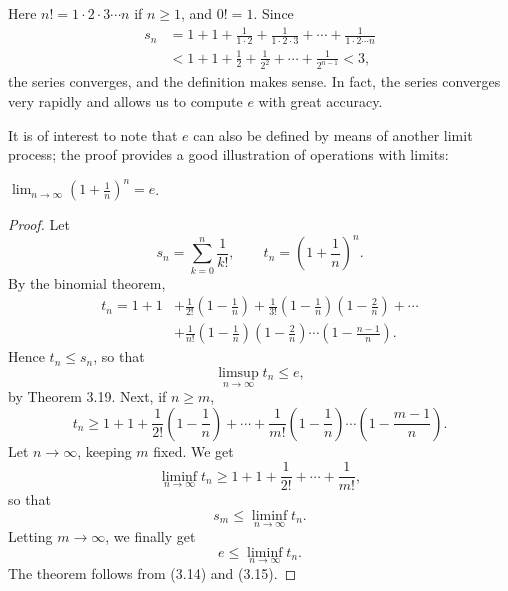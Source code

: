 Here $n! = 1\cdot2\cdot3\cdots n$ if $n \ge 1$, and $0! = 1$. Since
\begin{align*}
  s_n &= 1 + 1 + \frac{1}{1\cdot2} + \frac{1}{1\cdot2\cdot3} + \cdots +
        \frac{1}{1\cdot2\cdots n}\\
      &< 1 + 1 + \frac12 + \frac{1}{2^2} + \cdots + \frac{1}{2^{n-1}} < 3,
\end{align*}
the series converges, and the definition makes sense.
In fact, the series converges very rapidly and allows us to compute $e$ with
great accuracy.

It is of interest to note that $e$ can also be defined by means of another
limit process; the proof provides a good illustration of operations with
limits:

$\displaystyle\lim_{n\to\infty} \left(1+\frac{1}{n}\right)^n = e$.

\begin{proof}
Let
\[ s_n = \sum_{k=0}^{n} \frac{1}{k!}, \qquad
   t_n = \left(1+\frac{1}{n}\right)^n. \]
By the binomial theorem,
\begin{align*}
  t_n = 1 + 1 &+ \frac{1}{2!}\left(1-\frac1n\right)
        + \frac{1}{3!}\left(1-\frac1n\right)\left(1-\frac2n\right) + \cdots\\
      &+ \frac{1}{n!}\left(1-\frac1n\right)\left(1-\frac2n\right)\cdots
        \left(1-\frac{n-1}{n}\right).
\end{align*}
Hence $t_n \le s_n$, so that
\begin{equation}
  \limsup_{n\to\infty} t_n \le e, \tag{3.14}
\end{equation}
by Theorem 3.19. Next, if $n \ge m$,
\[ t_n \ge 1 + 1 + \frac{1}{2!}\left(1-\frac1n\right) + \cdots +
   \frac{1}{m!}\left(1-\frac1n\right)\cdots\left(1-\frac{m-1}{n}\right). \]
Let $n \to \infty$, keeping $m$ fixed. We get
\[ \liminf_{n\to\infty} t_n \ge 1 + 1 + \frac{1}{2!} + \cdots + \frac{1}{m!}, \]
so that
\[ s_m \le \liminf_{n\to\infty} t_n. \]
Letting $m \to \infty$, we finally get
\begin{equation}
  e \le \liminf_{n\to\infty} t_n. \tag{3.15}
\end{equation}
The theorem follows from (3.14) and (3.15).
\end{proof}

